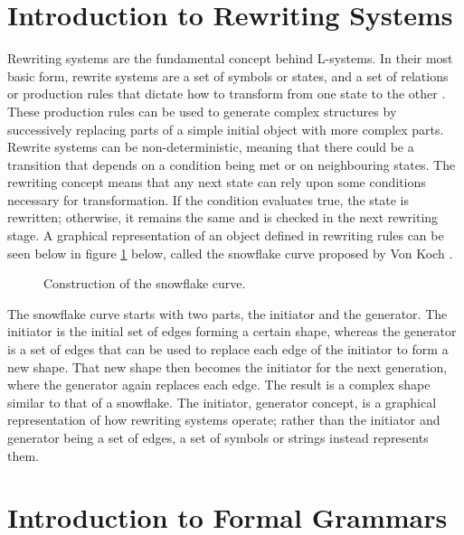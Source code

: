 \section{Introduction to Rewriting Systems}

Rewriting systems are the fundamental concept behind L-systems. In their most basic form, rewrite systems are a set of symbols or states, and a set of relations or production rules that dictate how to transform from one state to the other \cite{prusinkiewicz2012algorithmic}. These production rules can be used to generate complex structures by successively replacing parts of a simple initial object with more complex parts. Rewrite systems can be non-deterministic, meaning that there could be a transition that depends on a condition being met or on neighbouring states. The rewriting concept means that any next state can rely upon some conditions necessary for transformation. If the condition evaluates true, the state is rewritten; otherwise, it remains the same and is checked in the next rewriting stage. A graphical representation of an object defined in rewriting rules can be seen below in figure \ref{snowflake curve} below, called the snowflake curve proposed by Von Koch \cite{koch1906methode}.

\begin{figure}[htbp]
	{\centering
		\setlength{\fboxrule}{1pt}
		\vspace{7px}
		\caption{Construction of the snowflake curve\cite{prusinkiewicz2013lindenmayer}.} \label{snowflake curve}
	}
\end{figure}
\FloatBarrier

\noindent
The snowflake curve starts with two parts, the initiator and the generator. The initiator is the initial set of edges forming a certain shape, whereas the generator is a set of edges that can be used to replace each edge of the initiator to form a new shape. That new shape then becomes the initiator for the next generation, where the generator again replaces each edge. The result is a complex shape similar to that of a snowflake. The initiator, generator concept, is a graphical representation of how rewriting systems operate; rather than the initiator and generator being a set of edges, a set of symbols or strings instead represents them.

\section{Introduction to Formal Grammars}

